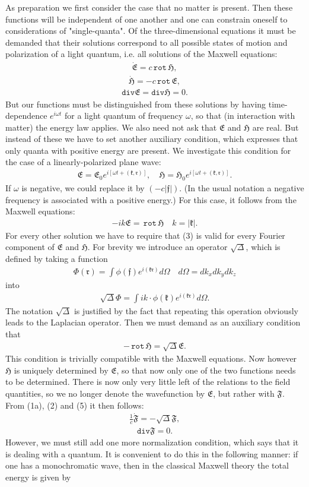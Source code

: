 \documentclass[a4paper,11pt]{article}
\newcommand{\?}[2]{#1\footnote{\textsc{Translator note}: #2}}
\newcommand{\nequ}[2]{\begin{align*}\tag{#1}#2\end{align*}}
\newcommand{\uequ}[1]{\begin{align*}#1\end{align*}}
\renewcommand{\operatorfont}[1]{\texttt{#1}}
\renewcommand{\div}{\operatorfont{div}}
\newcommand{\rot}{\,\operatorfont{rot}\,}
\renewcommand{\exp}[1]{e^{#1}}
\newcommand{\mf}[1]{\mathfrak{#1}}
\begin{document}
As preparation we first consider the case that no matter is present. Then these functions will be independent of one another and one can constrain oneself to considerations of "single-quanta". Of the three-dimensional equations it must be demanded that their solutions correspond to all possible states of motion and polarization of a light quantum, i.e. all solutions of the Maxwell equations:
\nequ{1a}{
\mf{\dot{E}} = c\rot \mf{H},
}
\nequ{1b}{
\mf{\dot{H}} = -c\rot\mf{E},
}
\nequ{2}{
\div\mf{E} = \div\mf{H} = 0.
}
But our functions must be distinguished from these solutions by having time-dependence $\exp{i\omega t}$ for a light quantum of frequency $\omega$, so that (in interaction with matter) the energy law applies. We also need not ask that $\mf{E}$ and $\mf{H}$ are real. But instead of these we have to set another auxiliary condition, which expresses that only quanta with positive energy are present. We investigate this condition for the case of a linearly-polarized plane wave:
\uequ{
\mf{E} = \mf{E}_0 \exp{i\left[\omega t + (\mf{k}, \mf{r})\right]},\quad
\mf{H} = \mf{H}_0 \exp{i\left[\omega t + (\mf{k}, \mf{r})\right]}.
}
If $\omega$ is negative, we could replace it by $(-c|\mf{f}|)$. (In the usual notation a negative frequency is associated with a positive energy.) For this case, it follows from the Maxwell equations:
\nequ{3}{
-ik\mf{E} = \rot\mf{H} \quad k=|\mf{k}|.
}
For every other solution we have to require that (3) is valid for every Fourier component of $\mf{E}$ and $\mf{H}$. For brevity we introduce an operator $\sqrt{\Delta}$, which is defined by taking a function
\uequ{
\Phi(\mf{r}) = \int\phi(\mf{f})\exp{i(\mf{kr})}d\Omega\quad
d\Omega = dk_x dk_y dk_z
}
into
\nequ{4}{
\sqrt{\Delta}\Phi = \int ik\cdot \phi(\mf{k})\exp{i(\mf{kr})}d\Omega.
}
The notation $\sqrt{\Delta}$ is justified by the fact that repeating this operation obviously leads to the Laplacian operator. Then we must demand as an auxiliary condition that
\nequ{5}{
-\rot{\mf{H}} = \sqrt{\Delta}\mf{E}.
}
This condition is trivially compatible with the Maxwell equations. Now however $\mf{H}$ is uniquely determined by $\mf{E}$, so that now only one of the two functions needs to be determined. There is now only very little left of the relations to the field quantities, so we no longer denote the wavefunction by $\mf{E}$, but rather with $\mf{F}$. From (1a), (2) and (5) it then follows:
\nequ{6a}{
\frac{1}{c}\mf{\dot{F}} = -\sqrt{\Delta}\mf{F},
}
\nequ{6b}{
\div\mf{F} = 0.
}
However, we must still add one more normalization condition, which says that it is dealing with a quantum. It is convenient to do this in the following manner: if one has a monochromatic wave, then in the classical Maxwell theory the total energy is given by
\end{document}
